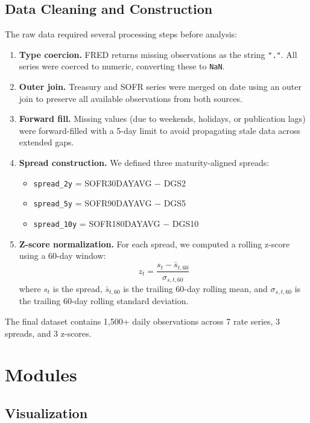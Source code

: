 \documentclass[
  11pt,
  letterpaper,
  DIV=11,
  numbers=noendperiod]{scrartcl}
\providecommand{\tightlist}{%
  \setlength{\itemsep}{0pt}\setlength{\parskip}{0pt}}
\begin{document}
\subsection{Data Cleaning and
Construction}\label{data-cleaning-and-construction}

The raw data required several processing steps before analysis:

\begin{enumerate}
\def\labelenumi{\arabic{enumi}.}
\tightlist
\item
  \textbf{Type coercion.} FRED returns missing observations as the
  string \texttt{"."}. All series were coerced to numeric, converting
  these to \texttt{NaN}.
\item
  \textbf{Outer join.} Treasury and SOFR series were merged on date
  using an outer join to preserve all available observations from both
  sources.
\item
  \textbf{Forward fill.} Missing values (due to weekends, holidays, or
  publication lags) were forward-filled with a 5-day limit to avoid
  propagating stale data across extended gaps.
\item
  \textbf{Spread construction.} We defined three maturity-aligned
  spreads:

  \begin{itemize}
  \tightlist
  \item
    \texttt{spread\_2y} = SOFR30DAYAVG \(-\) DGS2
  \item
    \texttt{spread\_5y} = SOFR90DAYAVG \(-\) DGS5
  \item
    \texttt{spread\_10y} = SOFR180DAYAVG \(-\) DGS10
  \end{itemize}
\item
  \textbf{Z-score normalization.} For each spread, we computed a rolling
  z-score using a 60-day window:
  \[z_t = \frac{s_t - \bar{s}_{t,60}}{\sigma_{s,t,60}}\] where \(s_t\)
  is the spread, \(\bar{s}_{t,60}\) is the trailing 60-day rolling mean,
  and \(\sigma_{s,t,60}\) is the trailing 60-day rolling standard
  deviation.
\end{enumerate}

The final dataset contains 1,500+ daily observations across 7 rate
series, 3 spreads, and 3 z-scores.

\section{Modules}\label{modules}

\subsection{Visualization}\label{visualization}
\end{document}
